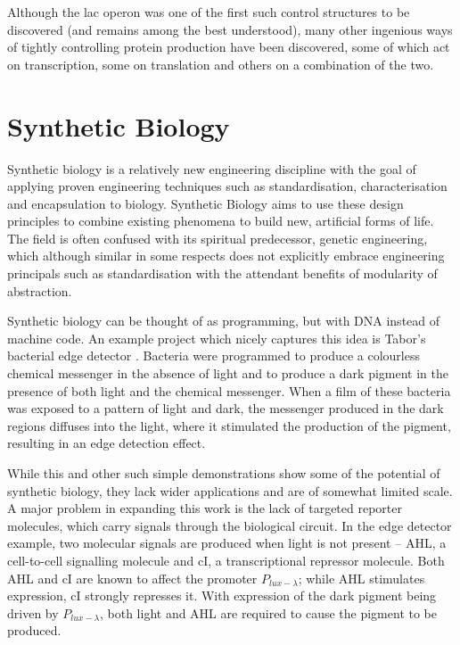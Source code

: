 Although the lac operon was one of the first such control structures to be
discovered (and remains among the best understood), many other ingenious ways
of tightly controlling protein production have been discovered, some of which
act on transcription, some on translation and others on a combination of the
two.

\section{Synthetic Biology}
\label{sec:synbio}

Synthetic biology is a relatively new
engineering discipline with the goal of applying proven engineering techniques
such as standardisation, characterisation and encapsulation to biology.
Synthetic Biology aims to use these design principles to combine existing 
phenomena to build new, artificial forms of life.
The field is often confused with its spiritual predecessor, genetic 
engineering, which although similar in some respects does not explicitly
embrace engineering principals such as standardisation with the attendant
benefits of modularity of abstraction.

Synthetic biology can be thought of as programming, but with DNA instead of 
machine code.
An example project which nicely captures this idea is Tabor's bacterial edge
detector \citep{edgeDetector}.
Bacteria were programmed to produce a colourless chemical messenger in the 
absence of light and to produce a dark pigment in the presence of both light 
and the chemical messenger.
When a film of these bacteria was exposed to a pattern of light and dark, the
messenger produced in the dark regions diffuses into the light, where it
stimulated the production of the pigment, resulting in an edge detection effect.

While this and other such simple demonstrations show some of the potential 
of synthetic biology, they lack wider applications and are of somewhat 
limited scale.
A major problem in expanding this work is the lack of targeted reporter
molecules, which carry signals through the biological circuit.
In the edge detector example, two molecular signals are produced when light is 
not present -- AHL, a cell-to-cell signalling molecule and cI, a
transcriptional repressor molecule.
Both AHL and cI are known to affect the promoter $P_{lux-\lambda}$; while AHL 
stimulates expression, cI strongly represses it.
With expression of the dark pigment being driven by $P_{lux-\lambda}$, 
both light and AHL are required to cause the pigment to be produced.

